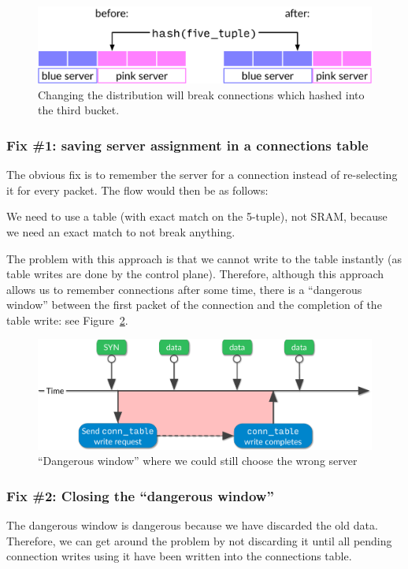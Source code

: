 \documentclass[11pt,oneside,a4paper]{article}
\begin{document}
\begin{figure}[h]
\centering
\includegraphics[width=.5\textwidth]{figures/hash-problem.pdf}
\caption{Changing the distribution will break connections which hashed into the
    third bucket.}
\label{fig:hash-problem}
\end{figure}

\subsubsection{Fix \#1: saving server assignment in a connections table}

The obvious fix is to remember the server for a connection instead of
re-selecting it for every packet.
The flow would then be as follows:


We need to use a table (with exact match on the 5-tuple), not SRAM, because we
need an exact match to not break anything.

The problem with this approach is that we cannot write to the table instantly
(as table writes are done by the control plane).
Therefore, although this approach allows us to remember connections after some
time, there is a ``dangerous window'' between the first packet of the connection
and the completion of the table write: see Figure~\ref{fig:timeline}.

\begin{figure}[h]
\centering
\includegraphics[width=.5\textwidth]{figures/timeline.pdf}
\caption{``Dangerous window'' where we could still choose the wrong
    server}
\label{fig:timeline}
\end{figure}

\subsubsection{Fix \#2: Closing the ``dangerous window''}
The dangerous window is dangerous because we have discarded the old data.
Therefore, we can get around the problem by not discarding it until all pending
connection writes using it have been written into the connections table.
\end{document}
